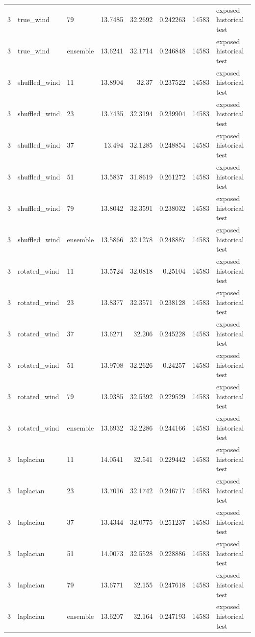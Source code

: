 \begin{tabular}{rllrrrrl}
3 & true\_wind & 79 & 13.7485 & 32.2692 & 0.242263 & 14583 & exposed historical test \\
3 & true\_wind & ensemble & 13.6241 & 32.1714 & 0.246848 & 14583 & exposed historical test \\
3 & shuffled\_wind & 11 & 13.8904 & 32.37 & 0.237522 & 14583 & exposed historical test \\
3 & shuffled\_wind & 23 & 13.7435 & 32.3194 & 0.239904 & 14583 & exposed historical test \\
3 & shuffled\_wind & 37 & 13.494 & 32.1285 & 0.248854 & 14583 & exposed historical test \\
3 & shuffled\_wind & 51 & 13.5837 & 31.8619 & 0.261272 & 14583 & exposed historical test \\
3 & shuffled\_wind & 79 & 13.8042 & 32.3591 & 0.238032 & 14583 & exposed historical test \\
3 & shuffled\_wind & ensemble & 13.5866 & 32.1278 & 0.248887 & 14583 & exposed historical test \\
3 & rotated\_wind & 11 & 13.5724 & 32.0818 & 0.25104 & 14583 & exposed historical test \\
3 & rotated\_wind & 23 & 13.8377 & 32.3571 & 0.238128 & 14583 & exposed historical test \\
3 & rotated\_wind & 37 & 13.6271 & 32.206 & 0.245228 & 14583 & exposed historical test \\
3 & rotated\_wind & 51 & 13.9708 & 32.2626 & 0.24257 & 14583 & exposed historical test \\
3 & rotated\_wind & 79 & 13.9385 & 32.5392 & 0.229529 & 14583 & exposed historical test \\
3 & rotated\_wind & ensemble & 13.6932 & 32.2286 & 0.244166 & 14583 & exposed historical test \\
3 & laplacian & 11 & 14.0541 & 32.541 & 0.229442 & 14583 & exposed historical test \\
3 & laplacian & 23 & 13.7016 & 32.1742 & 0.246717 & 14583 & exposed historical test \\
3 & laplacian & 37 & 13.4344 & 32.0775 & 0.251237 & 14583 & exposed historical test \\
3 & laplacian & 51 & 14.0073 & 32.5528 & 0.228886 & 14583 & exposed historical test \\
3 & laplacian & 79 & 13.6771 & 32.155 & 0.247618 & 14583 & exposed historical test \\
3 & laplacian & ensemble & 13.6207 & 32.164 & 0.247193 & 14583 & exposed historical test \\

\end{tabular}
